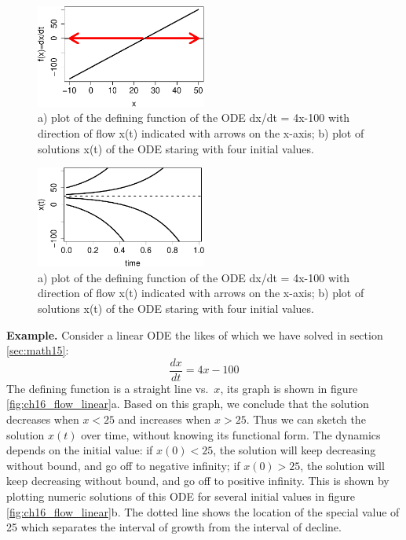 \documentclass[
  letterpaper,
  DIV=11,
  numbers=noendperiod]{scrreprt}
\begin{document}
\begin{figure}

{\centering \includegraphics[width=0.5\textwidth,height=\textheight]{./graph_odes_files/figure-pdf/ch7-flow1-1.pdf}

}

\caption{a) plot of the defining function of the ODE dx/dt = 4x-100 with
direction of flow x(t) indicated with arrows on the x-axis; b) plot of
solutions x(t) of the ODE staring with four initial values.}

\end{figure}

\begin{figure}

{\centering \includegraphics[width=0.5\textwidth,height=\textheight]{./graph_odes_files/figure-pdf/ch7-flow1-2.pdf}

}

\caption{a) plot of the defining function of the ODE dx/dt = 4x-100 with
direction of flow x(t) indicated with arrows on the x-axis; b) plot of
solutions x(t) of the ODE staring with four initial values.}

\end{figure}

\textbf{Example.} Consider a linear ODE the likes of which we have
solved in section \ref{sec:math15}: \[\frac{dx}{dt} = 4x -100\] The
defining function is a straight line vs.~\(x\), its graph is shown in
figure \ref{fig:ch16_flow_linear}a. Based on this graph, we conclude
that the solution decreases when \(x<25\) and increases when \(x>25\).
Thus we can sketch the solution \(x(t)\) over time, without knowing its
functional form. The dynamics depends on the initial value: if
\(x(0)<25\), the solution will keep decreasing without bound, and go off
to negative infinity; if \(x(0)>25\), the solution will keep decreasing
without bound, and go off to positive infinity. This is shown by
plotting numeric solutions of this ODE for several initial values in
figure \ref{fig:ch16_flow_linear}b. The dotted line shows the location
of the special value of 25 which separates the interval of growth from
the interval of decline.
\end{document}
